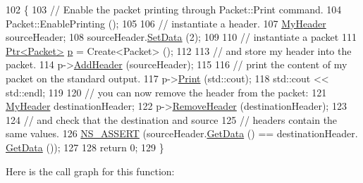 \begin{DoxyCode}
102 \{
103   \textcolor{comment}{// Enable the packet printing through Packet::Print command.}
104   Packet::EnablePrinting ();
105 
106   \textcolor{comment}{// instantiate a header.}
107   \hyperlink{classMyHeader}{MyHeader} sourceHeader;
108   sourceHeader.\hyperlink{classMyHeader_ad431310f2204f150d75717882c2bdb84}{SetData} (2);
109 
110   \textcolor{comment}{// instantiate a packet}
111   \hyperlink{classns3_1_1Ptr}{Ptr<Packet>} \hyperlink{lte__link__budget_8m_ac9de518908a968428863f829398a4e62}{p} = Create<Packet> ();
112 
113   \textcolor{comment}{// and store my header into the packet.}
114   p->\hyperlink{classns3_1_1Packet_a465108c595a0bc592095cbcab1832ed8}{AddHeader} (sourceHeader);
115 
116   \textcolor{comment}{// print the content of my packet on the standard output.}
117   p->\hyperlink{classns3_1_1Packet_aa34058a5cdbf94673531f8c4001ab227}{Print} (std::cout);
118   std::cout << std::endl;
119 
120   \textcolor{comment}{// you can now remove the header from the packet:}
121   \hyperlink{classMyHeader}{MyHeader} destinationHeader;
122   p->\hyperlink{classns3_1_1Packet_a0961eccf975d75f902d40956c93ba63e}{RemoveHeader} (destinationHeader);
123 
124   \textcolor{comment}{// and check that the destination and source}
125   \textcolor{comment}{// headers contain the same values.}
126   \hyperlink{assert_8h_a6dccdb0de9b252f60088ce281c49d052}{NS\_ASSERT} (sourceHeader.\hyperlink{classMyHeader_a84ce206ec1d4c56b0a42b2ae37d74724}{GetData} () == destinationHeader.
      \hyperlink{classMyHeader_a84ce206ec1d4c56b0a42b2ae37d74724}{GetData} ());
127 
128   \textcolor{keywordflow}{return} 0;
129 \}
\end{DoxyCode}


Here is the call graph for this function\+:



